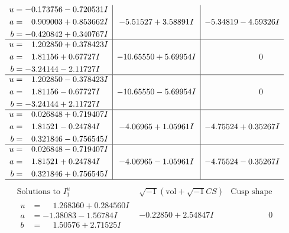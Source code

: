 \documentclass[1p]{elsarticle_modified}
\theoremstyle{definition}
\newcommand{\I}{\sqrt{-1}}
\begin{document}
$$\begin{array}{c|c|c}
\begin{aligned}
u &= -0.173756 - 0.720531 I \\
a &= \phantom{-}0.909003 + 0.853662 I \\
b &= -0.420842 + 0.340767 I\end{aligned}
 & -5.51527 + 3.58891 I & -5.34819 - 4.59326 I \\ \hline\begin{aligned}
u &= \phantom{-}1.202850 + 0.378423 I \\
a &= \phantom{-}1.81156 + 0.67727 I \\
b &= -3.24144 - 2.11727 I\end{aligned}
 & -10.65550 + 5.69954 I & \phantom{-0.000000 } 0 \\ \hline\begin{aligned}
u &= \phantom{-}1.202850 - 0.378423 I \\
a &= \phantom{-}1.81156 - 0.67727 I \\
b &= -3.24144 + 2.11727 I\end{aligned}
 & -10.65550 - 5.69954 I & \phantom{-0.000000 } 0 \\ \hline\begin{aligned}
u &= \phantom{-}0.026848 + 0.719407 I \\
a &= \phantom{-}1.81521 - 0.24784 I \\
b &= \phantom{-}0.321846 - 0.756545 I\end{aligned}
 & -4.06965 + 1.05961 I & -4.75524 + 0.35267 I \\ \hline\begin{aligned}
u &= \phantom{-}0.026848 - 0.719407 I \\
a &= \phantom{-}1.81521 + 0.24784 I \\
b &= \phantom{-}0.321846 + 0.756545 I\end{aligned}
 & -4.06965 - 1.05961 I & -4.75524 - 0.35267 I\\
 \hline 
 \end{array}$$\newpage$$\begin{array}{c|c|c}  
\text{Solutions to }I^u_{1}& \I (\text{vol} + \sqrt{-1}CS) & \text{Cusp shape}\\
 \hline 
\begin{aligned}
u &= \phantom{-}1.268360 + 0.284560 I \\
a &= -1.38083 - 1.56784 I \\
b &= \phantom{-}1.50576 + 2.71525 I\end{aligned}
 & -0.22850 + 2.54847 I & \phantom{-0.000000 } 0 \\ \hline\begin{aligned}

\end{aligned}
\end{array}$$
\end{document}
